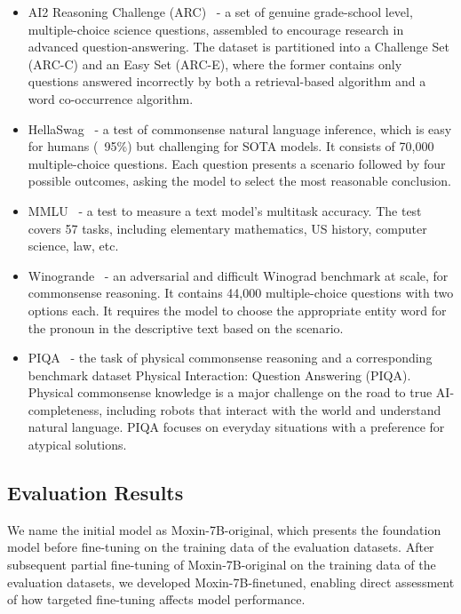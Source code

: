 \begin{itemize}
\item AI2 Reasoning Challenge (ARC)~\cite{allenai:arc} - a set of genuine grade-school level, multiple-choice science questions, assembled to encourage research in advanced question-answering. The dataset is partitioned into a Challenge Set (ARC-C) and an Easy Set (ARC-E), where the former contains only questions answered incorrectly by both a retrieval-based algorithm and a word co-occurrence algorithm.
\item HellaSwag~\cite{zellers2019hellaswag} - a test of commonsense natural language inference, which is easy for humans (~95\%) but challenging for SOTA models. It consists of 70,000 multiple-choice questions. Each question presents a scenario followed by four possible outcomes, asking the model to select the most reasonable conclusion.
\item MMLU~\cite{van2024ai} - a test to measure a text model's multitask accuracy. The test covers 57 tasks, including elementary mathematics, US history, computer science, law, etc.
\item Winogrande~\cite{sakaguchi2021winogrande} - an adversarial and difficult Winograd benchmark at scale, for commonsense reasoning. It contains 44,000 multiple-choice questions with two options each. It requires the model to choose the appropriate entity word for the pronoun in the descriptive text based on the scenario.
\item PIQA~\cite{bisk2019piqareasoningphysicalcommonsense} -   the task of physical commonsense reasoning and a corresponding benchmark dataset Physical Interaction: Question Answering (PIQA). Physical commonsense knowledge is a major challenge on the road to true AI-completeness, including robots that interact with the world and understand natural language. PIQA focuses on everyday situations with a preference for atypical solutions. 
\end{itemize}




\subsection{Evaluation Results}\label{sec4.2}


We name the initial model as Moxin-7B-original, which presents the foundation model before fine-tuning on the training data of the evaluation datasets. After subsequent partial fine-tuning of Moxin-7B-original on the training data of the evaluation datasets, we developed Moxin-7B-finetuned, enabling direct assessment of how targeted fine-tuning affects model performance. 





